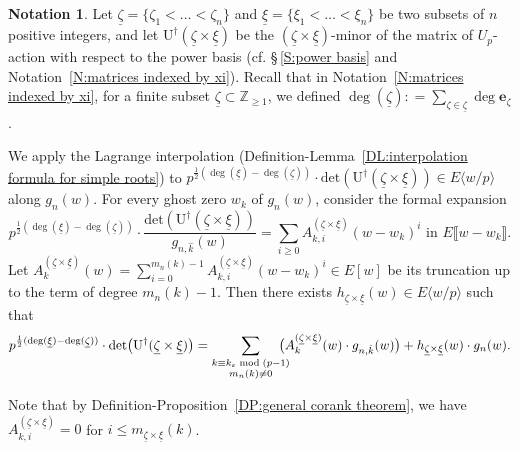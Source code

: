 \documentclass[12pt]{amsart}
\theoremstyle{definition}
\newtheorem{notation}[subsection]{Notation}
\numberwithin{equation}{subsection}
\def\ZZ{\mathbb{Z}}
\def\bfe{\mathbf{e}}
\def\rmU{\mathrm{U}}
\renewcommand{\det}{\mathrm{det}}
\begin{document}
\begin{notation}
\label{N:lagrange of det of Uxi}
Let $\underline \zeta =\{ \zeta_1< \dots< \zeta_n\}$ and $\underline \xi = \{\xi_1< \dots< \xi_n\}$ be two subsets of $n$ positive integers, and let $\rmU^\dagger(\underline \zeta \times \underline \xi)$ be the $(\underline \zeta \times \underline \xi)$-minor of the matrix of $U_p$-action with respect to the power basis (cf. \S\,\ref{S:power basis} and Notation~\ref{N:matrices indexed by xi}). Recall that in Notation~\ref{N:matrices indexed by xi}, for a finite subset $\underline \zeta \subset \ZZ_{\geq 1}$, we defined $\deg(\underline \zeta) : = \sum\limits_{\zeta \in \underline \zeta} \deg \bfe_\zeta$.

We apply the Lagrange interpolation (Definition-Lemma~\ref{DL:interpolation formula for simple roots}) to $p^{\frac 12(\deg(\underline \xi)-\deg(\underline \zeta))}\cdot \det(\rmU^\dagger(\underline\zeta\times \underline \xi))\in E\langle w/p\rangle$ along $g_n(w)$. For every ghost zero $w_k$ of $g_n(w)$, consider the formal expansion 
\begin{equation}
\label{E:expansion of det Uxi / g_n hat k(w)}
p^{\frac 12(\deg(\underline \xi)-\deg(\underline \zeta))}\cdot\frac{\det(\rmU^\dagger(\underline \zeta\times \underline \xi))}{g_{n,\hat{k}}(w)}=\sum_{i\geq 0} A_{k,i}^{(\underline \zeta\times \underline \xi)}(w-w_k)^i \text{~in~} E\llbracket w-w_k\rrbracket.
\end{equation}
Let $A_k^{(\underline \zeta\times \underline \xi)}(w)=\sum\limits_{i=0}^{m_n(k)-1}A_{k,i}^{(\underline \zeta\times \underline \xi)}(w-w_k)^i\in E[w]$ be its truncation up to the term of degree $m_n(k)-1$. Then there exists $h_{\underline \zeta\times \underline \xi}(w)\in E\langle w/p\rangle $ such that 
\begin{equation}
\label{E:Lagrange interpolation det Uxi}
p^{\frac 12(\deg(\underline \xi)-\deg(\underline \zeta))}\cdot\det\big(\rmU^{\dagger}(\underline \zeta \times \underline \xi)\big) = \sum_{\substack{k \equiv k_\varepsilon \bmod{(p-1)}\\ m_n(k) \neq 0 }} \hspace{-10pt}\big( A^{(\underline \zeta \times \underline \xi)}_k(w) \cdot  g_{n,\hat k}(w) \big) + h_{\underline \zeta \times \underline \xi}(w) \cdot g_n(w).
\end{equation}

Note that by Definition-Proposition~\ref{DP:general corank theorem}, we have $A_{k,i}^{(\underline \zeta\times \underline \xi)}=0$ for $i\leq m_{\underline \zeta\times \underline\xi}(k)$.
\end{notation}
\end{document}
